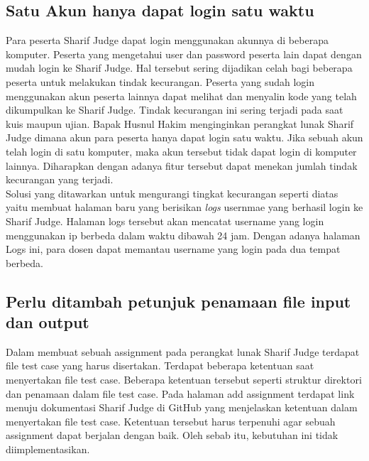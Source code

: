 \subsection{Satu Akun hanya dapat login satu waktu}
Para peserta Sharif Judge dapat login menggunakan akunnya di beberapa komputer. Peserta yang mengetahui user dan password peserta lain dapat dengan mudah login ke Sharif Judge. Hal tersebut sering dijadikan celah bagi beberapa peserta untuk melakukan tindak kecurangan. Peserta yang sudah login menggunakan akun peserta lainnya dapat melihat dan menyalin kode yang telah dikumpulkan ke Sharif Judge. Tindak kecurangan ini sering terjadi pada saat kuis maupun ujian. Bapak Husnul Hakim menginginkan perangkat lunak Sharif Judge dimana akun para peserta hanya dapat login satu waktu. Jika sebuah akun telah login di satu komputer, maka akun tersebut tidak dapat login di komputer lainnya. Diharapkan dengan adanya fitur tersebut dapat menekan jumlah tindak kecurangan yang terjadi. \\
Solusi yang ditawarkan untuk mengurangi tingkat kecurangan seperti diatas yaitu membuat halaman baru yang berisikan \textit{logs} usernmae yang berhasil login ke Sharif Judge. Halaman logs tersebut akan mencatat username yang login menggunakan ip berbeda dalam waktu dibawah 24 jam. Dengan adanya halaman Logs ini, para dosen dapat memantau username yang login pada dua tempat berbeda.	

\subsection{Perlu ditambah petunjuk penamaan file input dan output}
Dalam membuat sebuah assignment pada perangkat lunak Sharif Judge terdapat file test case yang harus disertakan. Terdapat beberapa ketentuan  saat menyertakan file test case. Beberapa ketentuan tersebut seperti struktur direktori dan penamaan dalam file test case. Pada halaman add assignment terdapat link menuju dokumentasi Sharif Judge di GitHub yang menjelaskan ketentuan dalam menyertakan file test case. Ketentuan tersebut harus terpenuhi agar sebuah assignment dapat berjalan dengan baik. Oleh sebab itu, kebutuhan ini tidak diimplementasikan.



